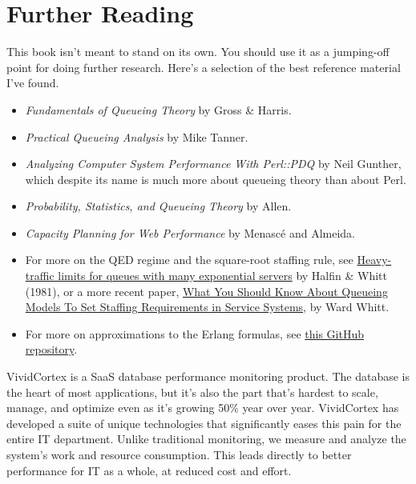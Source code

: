 \documentclass{vivid_layout}
\begin{document}
\section{Further Reading}

This book isn't meant to stand on its own. You should use it as a jumping-off
point for doing further research. Here's a selection of the best reference
material I've found.

\begin{itemize}
\item {\itshape Fundamentals of Queueing Theory} by Gross \& Harris.
\item {\itshape Practical Queueing Analysis} by Mike Tanner.
\item {\itshape Analyzing Computer System Performance With Perl::PDQ} by Neil
Gunther, which despite its name is much more about queueing theory than about
Perl.
\item {\itshape Probability, Statistics, and Queueing Theory} by Allen.
\item {\itshape Capacity Planning for Web Performance} by Menasc\'e and Almeida.
\item For more on the QED regime and the square-root staffing rule, see
\href{http://www.columbia.edu/~ww2040/HalfinWW1981.pdf}{Heavy-traffic limits for queues with many exponential servers} by Halfin \& Whitt (1981), or a more recent paper, \href{http://www.columbia.edu/~ww2040/shorter041907.pdf}{What You Should Know About Queueing Models To Set Staffing Requirements in Service Systems}, by Ward Whitt.
\item For more on approximations to the Erlang formulas, see
\href{https://github.com/VividCortex/approx-queueing-theory}{this GitHub
repository}.
\end{itemize}

\newpage

\begin{about}	%
VividCortex is a SaaS database performance monitoring product. The database is the heart of most applications, but it's also the part that's hardest to scale, manage, and optimize even as it's growing 50\% year over year. VividCortex has developed a suite of unique technologies that significantly eases this pain for the entire IT department. Unlike traditional monitoring, we measure
and analyze the system's work and resource consumption. This leads directly to better performance for IT as a whole, at reduced cost and effort.
\end{about}
\makeresources	%
\end{document}
